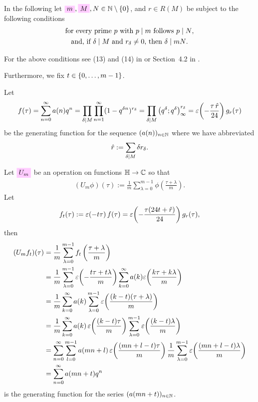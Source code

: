 \documentclass{article}
\begin{document}
In the following let
$\defineNotation[m]{m},
\defineNotation[M]{M},
N \in \setN \setminus \Set{0}$, and
$r \in R(M)$
be subject to the following conditions
\begin{gather}
  \text{for every prime $p$ with $p \mid m$ follows $p \mid N$,}
  \label{eq:p|m=>p|N}\\
  \text{and, if $\delta \mid M$ and $r_\delta\ne0$, then
    $\delta \mid mN$.}
  \label{eq:delta|M=>delta|mN}
\end{gather}

For the above conditions see (13) and (14) in
\cite{Radu:AlgorithmicApproachRamanujanCongruences:2009} or
Section~4.2 in \cite{Radu:PhD:2010}.

Furthermore, we fix $t\in\left\{0,\ldots,m-1\right\}$.


Let
\begin{gather*}
  f(\tau)
  =
  \sum_{n=0}^\infty a(n) q^n
  =
  \prod_{\delta \mid M}\prod_{n=1}^\infty(1-q^{\delta n})^{r_\delta}
  =
  \prod_{\delta \mid M}\left( q^{\delta};q^{\delta} \right)_{\infty}^{r_\delta}
  =
  \varepsilon\!\left(-\frac{\tau \, \hat{r}}{24}\right) g_r(\tau)
\end{gather*}
be the generating function for the sequence $(a(n))_{n\in\mathbb{N}}$
where we have abbreviated
\begin{gather}
  \hat{r} := \sum_{\delta \mid M} \delta r_\delta.
  \label{eq:sumdelta}
\end{gather}

Let $\defineNotation[U-m]{U_m}$ be an operation on functions
$\mathbb{H}\to\mathbb{C}$ so that
\begin{gather}
  (U_m\phi)(\tau) := \frac{1}{m}\sum_{\lambda=0}^{m-1}
  \phi\left(\frac{\tau+\lambda}{m}\right).
  \label{eq:U_m}
\end{gather}
Let
\begin{gather}
  f_t(\tau)
  :=\varepsilon\!\left(-t\tau\right)f(\tau)
  = \varepsilon\!\left(-\frac{\tau (24 t + \hat{r})}{24}\right) g_r(\tau),
  \label{eq:f_t}
\end{gather}
then
\begin{align}
  (U_mf_t)(\tau)
  &=
  \frac{1}{m} \sum_{\lambda=0}^{m-1}f_t\left(\frac{\tau+\lambda}{m}\right)
  \notag
  \\
  &=
  \frac{1}{m} \sum_{\lambda=0}^{m-1}
  \varepsilon\!\left(-\frac{t\tau+t\lambda}{m}\right)
  \sum_{k=0}^\infty a(k) \varepsilon\!\left(\frac{k\tau+k\lambda}{m}\right)
  \notag
  \\
  &=
  \frac{1}{m}
  \sum_{k=0}^\infty
  a(k)
  \sum_{\lambda=0}^{m-1}
  \varepsilon\!\left(\frac{(k-t)(\tau+\lambda)}{m}\right)
  \notag
  \\
  &=
  \frac{1}{m}
  \sum_{k=0}^\infty
  a(k)\,
  \varepsilon\!\left(\frac{(k-t)\tau}{m}\right)
  \sum_{\lambda=0}^{m-1}
  \varepsilon\!\left(\frac{(k-t)\lambda}{m}\right)
  \notag
  \\
  &=
    \sum_{n=0}^\infty
    \sum_{l=0}^{m-1} a(mn+l)\,
    \varepsilon\!\left(\frac{(mn+l-t)\tau}{m}\right)
    \frac{1}{m}
    \sum_{\lambda=0}^{m-1}\varepsilon\!\left(\frac{(mn+l-t)\lambda}{m}\right)
    \notag
  \\
  &=
    \sum_{n=0}^\infty a(mn+t) q^n
\end{align}
is the generating function for the series
$(a(mn+t))_{n\in\mathbb{N}}$.
\end{document}

